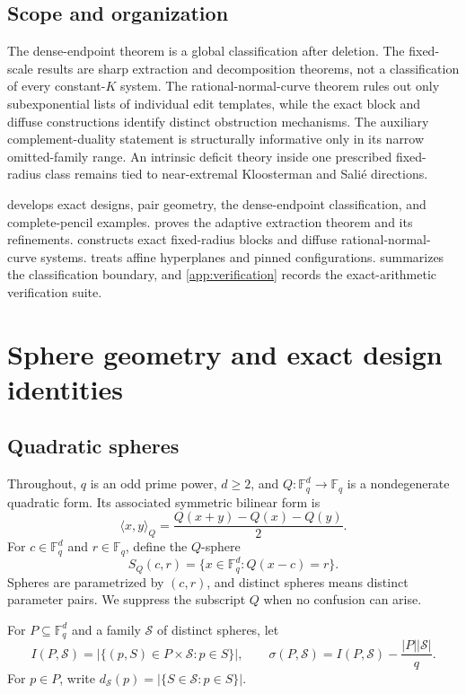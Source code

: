 \documentclass[11pt,letterpaper]{amsart}
\theoremstyle{definition}
\theoremstyle{remark}
\newcommand{\1}{\mathbf 1}
\newcommand{\ip}[2]{\langle #1,#2\rangle_Q}
\begin{document}
\subsection{Scope and organization}

The dense-endpoint theorem is a global classification after deletion.  The fixed-scale results are sharp extraction and decomposition theorems, not a classification of every constant-$K$ system.  The rational-normal-curve theorem rules out only subexponential lists of individual edit templates, while the exact block and diffuse constructions identify distinct obstruction mechanisms.  The auxiliary complement-duality statement is structurally informative only in its narrow omitted-family range.  An intrinsic deficit theory inside one prescribed fixed-radius class remains tied to near-extremal Kloosterman and Sali\'e directions.

 develops exact designs, pair geometry, the dense-endpoint classification, and complete-pencil examples.   proves the adaptive extraction theorem and its refinements.   constructs exact fixed-radius blocks and diffuse rational-normal-curve systems.   treats affine hyperplanes and pinned configurations.   summarizes the classification boundary, and \cref{app:verification} records the exact-arithmetic verification suite.

\section{Sphere geometry and exact design identities}\label{sec:geometry}

\subsection{Quadratic spheres}

Throughout, $q$ is an odd prime power, $d\ge2$, and $Q:\mathbb F_q^d\to\mathbb F_q$ is a nondegenerate quadratic form.  Its associated symmetric bilinear form is
\[
 \ip{x}{y}=\frac{Q(x+y)-Q(x)-Q(y)}2.
\]
For $c\in\mathbb F_q^d$ and $r\in\mathbb F_q$, define the $Q$-sphere
\[
 S_Q(c,r)=\{x\in\mathbb F_q^d:Q(x-c)=r\}.
\]
Spheres are parametrized by $(c,r)$, and distinct spheres means distinct parameter pairs.  We suppress the subscript $Q$ when no confusion can arise.

For $P\subseteq\mathbb F_q^d$ and a family $\mathcal S$ of distinct spheres, let
\[
 I(P,\mathcal S)=|\{(p,S)\in P\times\mathcal S:p\in S\}|,
 \qquad
 \sigma(P,\mathcal S)=I(P,\mathcal S)-\frac{|P||\mathcal S|}{q}.
\]
For $p\in P$, write $d_{\mathcal S}(p)=|\{S\in\mathcal S:p\in S\}|$.
\end{document}

